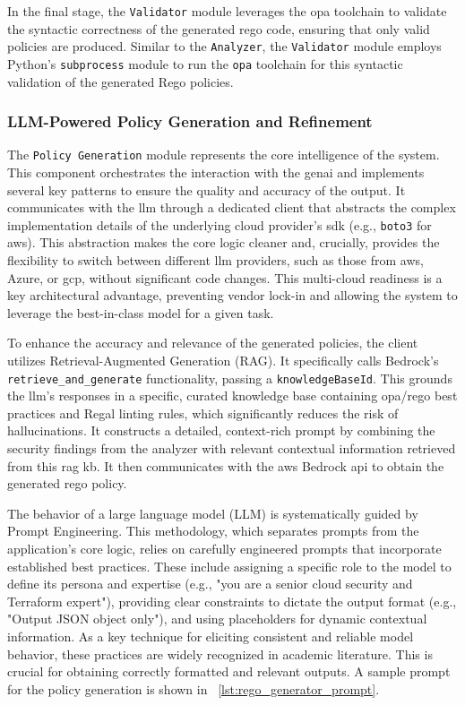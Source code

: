 In the final stage, the \texttt{Validator} module leverages the \gls{opa} toolchain to validate the syntactic correctness of the generated \gls{rego} code, ensuring that only valid policies are produced. Similar to the \texttt{Analyzer}, the \texttt{Validator} module employs Python's \texttt{subprocess} module to run the \texttt{opa} toolchain for this syntactic validation of the generated Rego policies.

\subsubsection{LLM-Powered Policy Generation and Refinement}

The \texttt{Policy Generation} module represents the core intelligence of the system. This component orchestrates the interaction with the \gls{genai} and implements several key patterns to ensure the quality and accuracy of the output. It communicates with the \gls{llm} through a dedicated client that abstracts the complex implementation details of the underlying cloud provider's \gls{sdk} (e.g., \texttt{boto3} for \gls{aws}). This abstraction makes the core logic cleaner and, crucially, provides the flexibility to switch between different \gls{llm} providers, such as those from \gls{aws}, Azure, or \gls{gcp}, without significant code changes. This multi-cloud readiness is a key architectural advantage, preventing vendor lock-in and allowing the system to leverage the best-in-class model for a given task.

To enhance the accuracy and relevance of the generated policies, the client utilizes Retrieval-Augmented Generation (RAG). It specifically calls Bedrock's \texttt{retrieve\_and\_generate} functionality, passing a \texttt{knowledgeBaseId}. This grounds the \gls{llm}'s responses in a specific, curated knowledge base containing \gls{opa}/\gls{rego} best practices and Regal linting rules, which significantly reduces the risk of hallucinations. It constructs a detailed, context-rich prompt by combining the security findings from the analyzer with relevant contextual information retrieved from this \gls{rag} \gls{kb}. It then communicates with the \gls{aws} Bedrock \gls{api} to obtain the generated \gls{rego} policy.

The behavior of a large language model (LLM) is systematically guided by Prompt Engineering. This methodology, which separates prompts from the application's core logic, relies on carefully engineered prompts that incorporate established best practices. These include assigning a specific role to the model to define its persona and expertise (e.g., "you are a senior cloud security and Terraform expert"), providing clear constraints to dictate the output format (e.g., "Output JSON object only"), and using placeholders for dynamic contextual information. As a key technique for eliciting consistent and reliable model behavior, these practices are widely recognized in academic literature\cite{sahoo_systematic_2024}. This is crucial for obtaining correctly formatted and relevant outputs. A sample prompt for the policy generation is shown in ~\ref{lst:rego_generator_prompt}.

